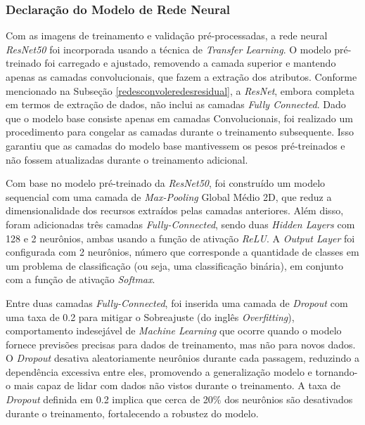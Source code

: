 
\subsubsection{\esp Declaração do Modelo de Rede Neural} \label{camadas}

Com as imagens de treinamento e validação pré-processadas, a rede neural \textit{ResNet50} foi incorporada usando a técnica de \textit{Transfer Learning}. O modelo pré-treinado foi carregado e ajustado, removendo a camada superior e mantendo apenas as camadas convolucionais, que fazem a extração dos atributos. Conforme mencionado na Subseção \ref{redesconvoleredesresidual}, a \textit{ResNet}, embora completa em termos de extração de dados, não inclui as camadas \textit{Fully Connected}. Dado que o modelo base consiste apenas em camadas Convolucionais, foi realizado um procedimento para congelar as camadas durante o treinamento subsequente. Isso garantiu que as camadas do modelo base mantivessem os pesos pré-treinados e não fossem atualizadas durante o treinamento adicional. 

Com base no modelo pré-treinado da \textit{ResNet50}, foi construído um modelo sequencial com uma camada de \textit{Max-Pooling} Global Médio 2D, que reduz a dimensionalidade dos recursos extraídos pelas camadas anteriores. Além disso, foram adicionadas três camadas \textit{Fully-Connected}, sendo duas \textit{Hidden Layers} com 128 e 2 neurônios, ambas usando a função de ativação \textit{ReLU}. A \textit{Output Layer} foi configurada com 2 neurônios, número que corresponde a quantidade de classes em um problema de classificação (ou seja, uma classificação binária), em conjunto com a função de ativação \textit{Softmax}.

Entre duas camadas \textit{Fully-Connected}, foi inserida uma camada de \textit{Dropout} com uma taxa de 0.2 para mitigar o Sobreajuste (do inglês \textit{Overfitting}), comportamento indesejável de \textit{Machine Learning} que ocorre quando o modelo fornece previsões precisas para dados de treinamento, mas não para novos dados. O \textit{Dropout} desativa aleatoriamente neurônios durante cada passagem, reduzindo a dependência excessiva entre eles, promovendo a generalização modelo e tornando-o mais capaz de lidar com dados não vistos durante o treinamento. A taxa de \textit{Dropout} definida em 0.2 implica que cerca de 20\% dos neurônios são desativados durante o treinamento, fortalecendo a robustez do modelo.



